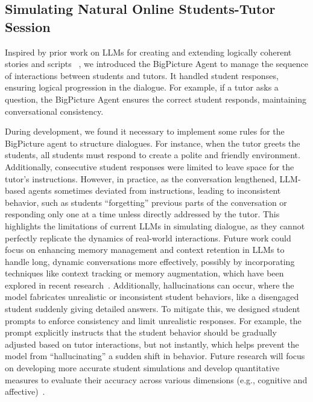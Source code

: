 \subsection{Simulating Natural Online Students-Tutor Session }

Inspired by prior work on LLMs for creating and extending logically coherent stories and scripts ~\cite{mirowski2023co,shakeri2021saga,grigis2024playwriting}, we introduced the BigPicture Agent to manage the sequence of interactions between students and tutors. It handled student responses, ensuring logical progression in the dialogue. For example, if a tutor asks a question, the BigPicture Agent ensures the correct student responds, maintaining conversational consistency.

During development, we found it necessary to implement some rules for the BigPicture agent to structure dialogues. For instance, when the tutor greets the students, all students must respond to create a polite and friendly environment. Additionally, consecutive student responses were limited to leave space for the tutor’s instructions. However, in practice, as the conversation lengthened, LLM-based agents sometimes deviated from instructions, leading to inconsistent behavior, such as students ``forgetting'' previous parts of the conversation or responding only one at a time unless directly addressed by the tutor. This highlights the limitations of current LLMs in simulating dialogue, as they cannot perfectly replicate the dynamics of real-world interactions. Future work could focus on enhancing memory management and context retention in LLMs to handle long, dynamic conversations more effectively, possibly by incorporating techniques like context tracking or memory augmentation, which have been explored in recent research~\cite{wang2024augmenting, yi2024survey}. Additionally, hallucinations can occur, where the model fabricates unrealistic or inconsistent student behaviors, like a disengaged student suddenly giving detailed answers. To mitigate this, we designed student prompts to enforce consistency and limit unrealistic responses. For example, the prompt explicitly instructs that the student behavior should be gradually adjusted based on tutor interactions, but not instantly, which helps prevent the model from ``hallucinating'' a sudden shift in behavior. Future research will focus on developing more accurate student simulations and develop quantitative measures to evaluate their accuracy across various dimensions (e.g., cognitive and affective)~\cite{kaser2024simulated}.
 


